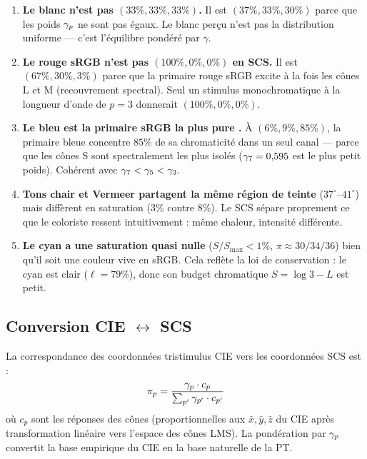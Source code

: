 \documentclass[12pt,a4paper]{article}
\begin{document}
\begin{enumerate}[nosep]
\item \textbf{Le blanc n'est pas $(33\%, 33\%, 33\%)$.} Il est
  $(37\%, 33\%, 30\%)$ parce que les poids $\gamma_{p}$ ne sont pas
  \'egaux. Le blanc per\c{c}u n'est pas la distribution uniforme ---
  c'est l'\'equilibre pond\'er\'e par $\gamma$.

\item \textbf{Le rouge sRGB n'est pas $(100\%, 0\%, 0\%)$ en SCS.}
  Il est $(67\%, 30\%, 3\%)$ parce que la primaire rouge sRGB excite
  \`a la fois les c\^ones L et M (recouvrement spectral). Seul un
  stimulus monochromatique \`a la longueur d'onde de $p=3$ donnerait
  $(100\%, 0\%, 0\%)$.

\item \textbf{Le bleu est la primaire sRGB la plus \og pure \fg.}
  \`A $(6\%, 9\%, 85\%)$, la primaire bleue concentre $85\%$ de sa
  chromaticit\'e dans un seul canal --- parce que les c\^ones S sont
  spectralement les plus isol\'es ($\gamma_{7} = 0{,}595$ est le plus
  petit poids). Coh\'erent avec
  $\gamma_{7} < \gamma_{5} < \gamma_{3}$.

\item \textbf{Tons chair et Vermeer partagent la m\^eme r\'egion de
  teinte} ($37^\circ$--$41^\circ$) mais diff\`erent en saturation
  ($3\%$ contre $8\%$). Le SCS s\'epare proprement ce que le
  coloriste ressent intuitivement : m\^eme chaleur, intensit\'e
  diff\'erente.

\item \textbf{Le cyan a une saturation quasi nulle}
  ($S/S_{\max} < 1\%$, $\pi \approx 30/34/36$) bien qu'il soit une
  couleur vive en sRGB. Cela refl\`ete la loi de conservation : le
  cyan est clair ($\ell = 79\%$), donc son budget chromatique
  $S = \log 3 - L$ est petit.
\end{enumerate}

\subsection{Conversion CIE $\leftrightarrow$ SCS}

La correspondance des coordonn\'ees tristimulus CIE vers les
coordonn\'ees SCS est :
\begin{equation}
  \pi_p = \frac{\gamma_{p} \cdot c_p}{\sum_{p'} \gamma_{p'} \cdot c_{p'}}
\end{equation}
o\`u $c_p$ sont les r\'eponses des c\^ones (proportionnelles aux
$\bar{x}, \bar{y}, \bar{z}$ du CIE apr\`es transformation lin\'eaire
vers l'espace des c\^ones LMS). La pond\'eration par $\gamma_{p}$
convertit la base empirique du CIE en la base naturelle de la PT.
\end{document}
